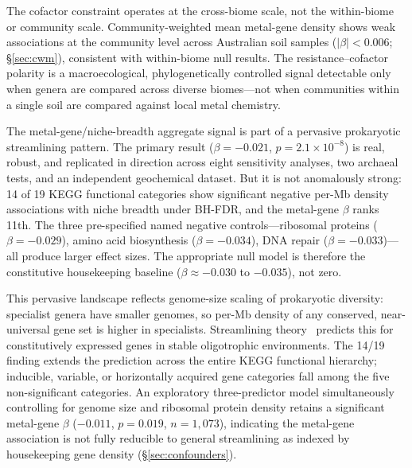 \documentclass[times]{zHenriquesLab-StyleBioRxiv}
\begin{document}
The cofactor constraint operates at the cross-biome scale, not the within-biome
or community scale. Community-weighted mean metal-gene density shows weak
associations at the community level across Australian soil samples ($|\beta|
< 0.006$; \S\ref{sec:cwm}), consistent with within-biome null results. The
resistance--cofactor polarity is a macroecological, phylogenetically controlled
signal detectable only when genera are compared across diverse biomes---not when
communities within a single soil are compared against local metal chemistry.

The metal-gene/niche-breadth aggregate signal is part of a pervasive
prokaryotic streamlining pattern.
The primary result ($\beta = -0.021$, $p = 2.1 \times 10^{-8}$) is real,
robust, and replicated in direction across eight sensitivity analyses, two
archaeal tests, and an independent geochemical dataset. But it is not
anomalously strong: 14 of 19 KEGG functional categories show significant
negative per-Mb density associations with niche breadth under BH-FDR, and the
metal-gene $\beta$ ranks 11th. The three pre-specified named negative
controls---ribosomal proteins ($\beta = -0.029$), amino acid biosynthesis
($\beta = -0.034$), DNA repair ($\beta = -0.033$)---all produce larger effect
sizes. The appropriate null model is therefore the constitutive housekeeping
baseline ($\beta \approx -0.030$ to $-0.035$), not zero.

This pervasive landscape reflects genome-size scaling of prokaryotic diversity:
specialist genera have smaller genomes, so per-Mb density of any conserved,
near-universal gene set is higher in specialists.
Streamlining theory~\cite{giovannoni2014,simonsen2021,peng2025,hao2026}
predicts this for constitutively expressed genes in stable oligotrophic
environments. The 14/19 finding extends the prediction across the entire KEGG
functional hierarchy; inducible, variable, or horizontally acquired gene
categories fall among the five non-significant categories.
An exploratory three-predictor model simultaneously controlling for genome size
and ribosomal protein density retains a significant metal-gene $\beta$
($-0.011$, $p = 0.019$, $n = 1{,}073$), indicating the metal-gene association
is not fully reducible to general streamlining as indexed by housekeeping gene
density (\S\ref{sec:confounders}).



\end{document}

